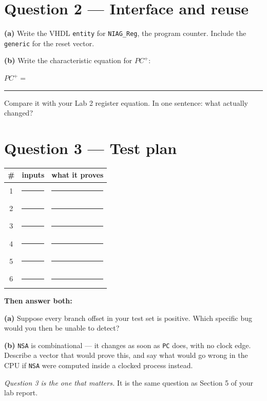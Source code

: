 \documentclass[11pt]{article}
\newcommand{\code}[1]{\texttt{#1}}
\newcommand{\answerbox}[1]{\vspace{2pt}\fbox{\parbox[c][#1][c]{\dimexpr\linewidth-2\fboxsep-2\fboxrule}{\ }}\vspace{4pt}}
\begin{document}
\answerbox{2.6cm}

\section*{Question 2 --- Interface and reuse}

\textbf{(a)} Write the VHDL \code{entity} for \code{NIAG\_Reg}, the program
counter. Include the \code{generic} for the reset vector.

\answerbox{4.0cm}

\textbf{(b)} Write the characteristic equation for $PC^{+}$:

\vspace{6pt}
$PC^{+} = $ \rule{10cm}{0.4pt}
\vspace{8pt}

Compare it with your Lab 2 register equation. In one sentence: what actually
changed?

\answerbox{1.4cm}

\section*{Question 3 --- Test plan}

\begin{center}
\begin{tabular}{@{}c@{\hskip 8pt}p{5.0cm}@{\hskip 8pt}p{7.6cm}@{}}
\toprule
\# & inputs & what it proves \\
\midrule
1 & \rule{4.8cm}{0.4pt} & \rule{7.4cm}{0.4pt} \\[8pt]
2 & \rule{4.8cm}{0.4pt} & \rule{7.4cm}{0.4pt} \\[8pt]
3 & \rule{4.8cm}{0.4pt} & \rule{7.4cm}{0.4pt} \\[8pt]
4 & \rule{4.8cm}{0.4pt} & \rule{7.4cm}{0.4pt} \\[8pt]
5 & \rule{4.8cm}{0.4pt} & \rule{7.4cm}{0.4pt} \\[8pt]
6 & \rule{4.8cm}{0.4pt} & \rule{7.4cm}{0.4pt} \\
\bottomrule
\end{tabular}
\end{center}

\textbf{Then answer both:}

\textbf{(a)} Suppose every branch offset in your test set is positive. Which
specific bug would you then be unable to detect?

\answerbox{1.6cm}

\textbf{(b)} \code{NSA} is combinational --- it changes as soon as \code{PC}
does, with no clock edge. Describe a vector that would prove this, and say what
would go wrong in the CPU if \code{NSA} were computed inside a clocked process
instead.

\answerbox{2.2cm}

\vfill
{\small\emph{Question 3 is the one that matters.} It is the same question as
Section 5 of your lab report.}
\end{document}
